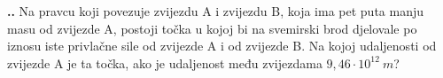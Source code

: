 

\noindent 
\textbf{
\thecjelina.\thezadatak.}
Na pravcu koji povezuje zvijezdu A i zvijezdu B, koja ima pet puta manju masu od zvijezde
A, postoji točka u kojoj bi na svemirski brod djelovale po iznosu iste privlačne sile od zvijezde
A i od zvijezde B. Na kojoj udaljenosti od zvijezde A je ta točka, ako je udaljenost među
zvijezdama $9,46 \cdot 10^{12}\ m$?

